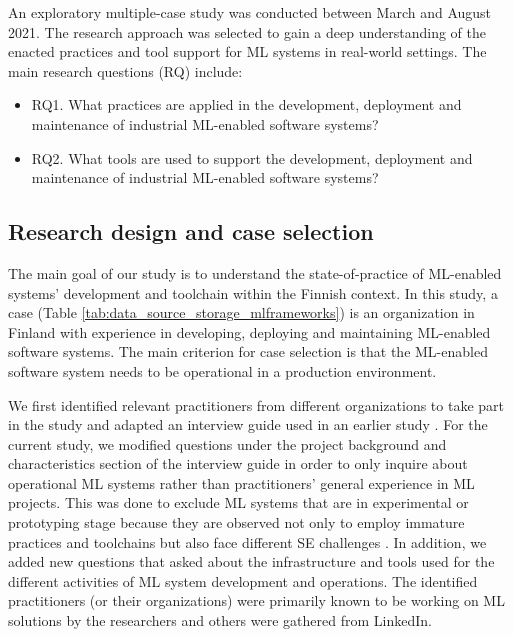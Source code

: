 %

An exploratory multiple-case study \cite{Runeson2008} was conducted between March and August 2021. The research approach was selected to gain a deep understanding of the enacted practices and tool support for ML systems in real-world settings.
The main research questions (RQ) include:
\begin{itemize}
    \item RQ1. What practices are applied in the development, deployment and maintenance of industrial ML-enabled software systems?
    \item RQ2. What tools are used to support the development, deployment and maintenance of industrial ML-enabled software systems?
\end{itemize}

\subsection{Research design and case selection}
The main goal of our study is to understand the state-of-practice of ML-enabled systems' development and toolchain within the Finnish context. In this study, a case (Table \ref{tab:data_source_storage_mlframeworks}) is an organization in Finland with experience in developing, deploying and maintaining ML-enabled software systems. The main criterion for case selection is that the ML-enabled software system needs to be operational in a production environment. %

We first identified relevant practitioners from different organizations to take part in the study and adapted an interview guide used in an earlier study \cite{Lwakatare2019}. For the current study, we modified questions under the project background and characteristics section of the interview guide in order to only inquire about operational ML systems rather than practitioners' general experience in ML projects. This was done to exclude ML systems that are in experimental or prototyping stage because they are observed not only to employ immature practices and toolchains but also face different SE challenges \cite{Lwakatare2019}. In addition, we added new questions that asked about the infrastructure and tools used for the different activities of ML system development and operations. The identified practitioners (or their organizations) were primarily known to be working on ML solutions by the researchers and others were gathered from LinkedIn. %

